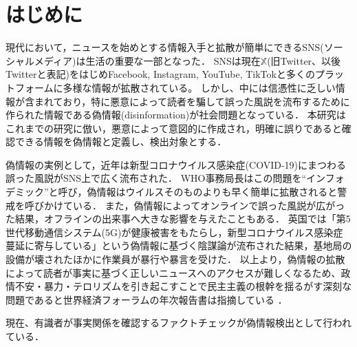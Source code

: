 \chapter{はじめに}
\label{ch:introduction}
現代において，ニュースを始めとする情報入手と拡散が簡単にできるSNS(ソーシャルメディア)は生活の重要な一部となった．
SNSは現在$\mathbb{X}$(旧Twitter、以後Twitterと表記)をはじめFacebook, Instagram, YouTube, TikTokと多くのプラットフォームに多様な情報が拡散されている。
しかし、中には信憑性に乏しい情報が含まれており，特に悪意によって読者を騙して誤った風説を流布するために作られた情報である偽情報(disinformation)が社会問題となっている．
本研究はこれまでの研究\cite{Shu:2017:FND:3137597.3137600,Ruchansky:2017:CHD:3132847.3132877,Wang:2018:EEA:3219819.3219903}に倣い，悪意によって意図的に作成され，明確に誤りであると確認できる情報を偽情報と定義し、検出対象とする．

偽情報の実例として，近年は新型コロナウイルス感染症(COVID-19)にまつわる誤った風説がSNS上で広く流布された．
WHO事務局長はこの問題を``インフォデミック''と呼び，偽情報はウイルスそのものよりも早く簡単に拡散されると警戒を呼びかけている\cite{ZAROCOSTAS2020676}．
また，偽情報によってオンラインで誤った風説が広がった結果，オフラインの出来事へ大きな影響を与えたこともある．
英国では「第5世代移動通信システム(5G)が健康被害をもたらし，新型コロナウイルス感染症蔓延に寄与している」という偽情報に基づく陰謀論が流布された結果，基地局の設備が壊された\cite{waterson_hern_2020}ほかに作業員が暴行や暴言を受けた\cite{hern_2020}．
以上より，偽情報の拡散によって読者が事実に基づく正しいニュースへのアクセスが難しくなるため、政情不安・暴力・テロリズムを引き起こすことで民主主義の根幹を揺るがす深刻な問題であると世界経済フォーラムの年次報告書は指摘している \cite{mclennan2024global}．

現在、有識者が事実関係を確認するファクトチェックが偽情報検出として行われている．

